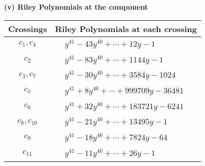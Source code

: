 \documentclass[1p]{elsarticle_modified}
\theoremstyle{definition}
\begin{document}
\newpage\renewcommand{\arraystretch}{1}
\flushleft \textbf{(v) Riley Polynomials at the component}\newline \\
\begin{tabular}{m{50pt}|m{274pt}}
Crossings & \hspace{64pt}Riley Polynomials at each crossing \\
\hline $$\begin{aligned}c_{1},c_{4}\end{aligned}$$&$\begin{aligned}
&y^{41}-43 y^{40}+\cdots+12 y-1
\end{aligned}$\\
\hline $$\begin{aligned}c_{2}\end{aligned}$$&$\begin{aligned}
&y^{41}-83 y^{40}+\cdots+1144 y-1
\end{aligned}$\\
\hline $$\begin{aligned}c_{3},c_{7}\end{aligned}$$&$\begin{aligned}
&y^{41}-30 y^{40}+\cdots+3584 y-1024
\end{aligned}$\\
\hline $$\begin{aligned}c_{5}\end{aligned}$$&$\begin{aligned}
&y^{41}+8 y^{40}+\cdots+999709 y-36481
\end{aligned}$\\
\hline $$\begin{aligned}c_{6}\end{aligned}$$&$\begin{aligned}
&y^{41}+32 y^{40}+\cdots+183721 y-6241
\end{aligned}$\\
\hline $$\begin{aligned}c_{8},c_{10}\end{aligned}$$&$\begin{aligned}
&y^{41}-21 y^{40}+\cdots+13495 y-1
\end{aligned}$\\
\hline $$\begin{aligned}c_{9}\end{aligned}$$&$\begin{aligned}
&y^{41}-18 y^{40}+\cdots+7824 y-64
\end{aligned}$\\
\hline $$\begin{aligned}c_{11}\end{aligned}$$&$\begin{aligned}
&y^{41}-11 y^{40}+\cdots+26 y-1
\end{aligned}$\\
\hline
\end{tabular}\\~\\
\end{document}
